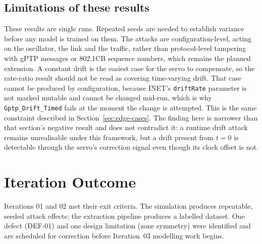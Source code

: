 \subsection{Limitations of these results}
\label{sec:ring-limits}

These results are single runs. Repeated seeds are needed to establish variance before any
model is trained on them. The attacks are configuration-level, acting on the oscillator,
the link and the traffic, rather than protocol-level tampering with gPTP messages or
802.1CB sequence numbers, which remains the planned extension. A constant drift is the
easiest case for the servo to compensate, so the rate-ratio result should not be read as
covering time-varying drift. That case cannot be produced by configuration, because
INET's \texttt{driftRate} parameter is not marked mutable and cannot be changed
mid-run, which is why \texttt{Gptp\_Drift\_Timed} fails at the moment the change is
attempted. This is the same constraint described in Section~\ref{sec:edge-cases}. The
finding here is narrower than that section's negative result and does not contradict it:
a runtime drift attack remains unrealisable under this framework, but a drift present from
$t=0$ is detectable through the servo's correction signal even though its clock offset is
not.

\section{Iteration Outcome}
Iterations 01 and 02 met their exit criteria. The simulation produces repeatable,
seeded attack effects; the extraction pipeline produces a labelled dataset. One
defect (DEF-01) and one design limitation (zone symmetry) were identified and are
scheduled for correction before Iteration~03 modelling work begins.

